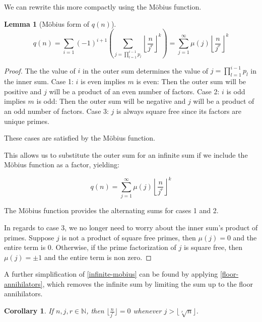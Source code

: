 \documentclass[10pt,a4paper]{article}
\newtheorem{lemma}[theorem]{Lemma}
\newtheorem{corollary}{Corollary}[theorem]
\theoremstyle{definition}
\theoremstyle{remark}
\begin{document}
We can rewrite this more compactly using the M\"obius function.
\begin{lemma}[M\"obius form of \(q(n)\)]
	\begin{equation}
			q(n)=\sum_{i=1}(-1)^{i+1}\left(\sum_{j= \prod_{l=1}^{i-1}p_l}\left\lfloor\frac{n}{j^r}\right\rfloor^k\right)=\sum_{j=1}^{\infty}\mu(j)\left\lfloor\frac{n}{j^r}\right\rfloor^k
	\end{equation}
\end{lemma}
\begin{proof}
	The the value of \(i\) in the outer sum determines the value of \(j=\prod_{l=1}^{i-1}p_l\) in the inner sum. \newline
	Case 1: \(i\) is even implies \(m\) is even: Then the outer sum will be positive and \(j\) will be a product of an even number of factors.\newline
	Case 2: \(i\) is odd implies \(m\) is odd: Then the outer sum will be negative and \(j\) will be a product of an odd number of factors. \newline
	Case 3: \(j\) is always square free since its factors are unique primes. 
	
	These cases are satisfied by the M\"obius function.

	This allows us to substitute the outer sum for an infinite sum if we include the M\"obius function as a factor, yielding:
	
	\begin{equation}\label{infinite-mobius}
		q(n)=\sum_{j=1}^{\infty}\mu(j)\left\lfloor\frac{n}{j^r}\right\rfloor^k
	\end{equation}

	The M\"obius function provides the alternating sums for cases 1 and 2. 
	
	In regards to case 3, we no longer need to worry about the inner sum's product of primes. Suppose \(j\) is not a product of square free primes, then \(\mu(j)=0\) and the entire term is 0. Otherwise, if the prime factorization of \(j\) is square free, then \(\mu(j)=\pm1\) and the entire term is non zero.
\end{proof}

	A further simplification of \cref{infinite-mobius} can be found by applying \cref{floor-annihilators}, which removes the infinite sum by limiting the sum up to the floor annihilators.
	
\begin{corollary}
If $n, j, r \in \mathbb{N}$, then $\lfloor\frac{n}{j^r}\rfloor = 0$  whenever $j>\lfloor \sqrt[r]{n}\rfloor$.
\end{corollary}
\end{document}
